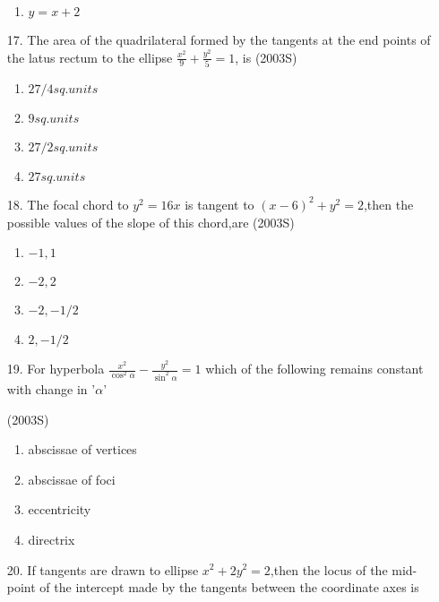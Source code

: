 \documentclass[journal,12pt,twocolumn]{IEEEtran}
\theoremstyle{remark}
\begin{document}
\begin{enumerate}
\begin{enumerate}
    \item $y=x+2$\\
\end{enumerate}
\item[17.] The area of the quadrilateral formed by the tangents at the end points of the latus rectum to the ellipse $\frac{x^{2}}{9}+\frac{y^{2}}{5}=1$, is \hfill{(2003S)}
\begin{enumerate}
    \item $27/4 sq.units$\\
    \item $9 sq.units$\\
    \item $27/2 sq.units$\\
    \item $27 sq.units$\\
\end{enumerate}
\item[18.] The focal chord to $y^{2}=16x$ is tangent to $(x-6)^{2}+y^{2}=2$,then the possible values of the slope of this chord,are \hfill{(2003S)}
\begin{enumerate}
    \item ${-1,1}$\\
    \item ${-2,2}$\\
    \item ${-2,-1/2}$\\
    \item ${2,-1/2}$\\
\end{enumerate}
\item[19.] For hyperbola $\frac{x^{2}}{\cos^{2}\alpha}-\frac{y^{2}}{\sin^{2}\alpha}=1$ which of the following remains constant with change in '$\alpha$'

\hfill{(2003S)}
\begin{enumerate}
    \item abscissae of vertices\\
    \item abscissae of foci\\
    \item eccentricity\\
    \item directrix\\
\end{enumerate}
\item[20.] If tangents are drawn to ellipse $x^{2}+2y^{2}=2$,then the locus of the mid-point of the intercept made by the tangents between the coordinate axes is 


\end{enumerate}
\end{document}
